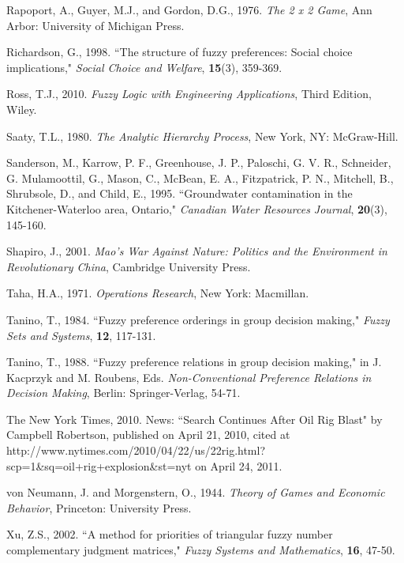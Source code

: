 \documentclass[letterpaper,12pt,titlepage,oneside,final]{book}
\begin{document}
\begin{thebibliography}{}
Rapoport, A., Guyer, M.J., and Gordon, D.G., 1976. \emph{The 2 x 2 Game}, Ann Arbor: University of Michigan Press.

Richardson, G., 1998. ``The structure of fuzzy preferences: Social choice implications," \emph{Social Choice and Welfare}, {\bf 15}(3), 359-369.

Ross, T.J., 2010. \emph{Fuzzy Logic with Engineering Applications}, Third Edition, Wiley.

Saaty, T.L., 1980. \emph{The Analytic Hierarchy Process}, New York, NY: McGraw-Hill.

Sanderson, M., Karrow, P. F., Greenhouse, J. P., Paloschi, G. V. R., Schneider, G. Mulamoottil, G., Mason, C., McBean, E. A., Fitzpatrick, P. N., Mitchell, B., Shrubsole, D., and Child, E., 1995. ``Groundwater contamination in the Kitchener-Waterloo area, Ontario," \emph{Canadian Water Resources Journal}, {\bf 20}(3), 145-160.

Shapiro, J., 2001. \emph{Mao's War Against Nature: Politics and the Environment in Revolutionary China}, Cambridge University Press.

Taha, H.A., 1971. \emph{Operations Research}, New York: Macmillan.

Tanino, T., 1984. ``Fuzzy preference orderings in group decision making," \emph{Fuzzy Sets and Systems}, {\bf 12}, 117-131.

Tanino, T., 1988. ``Fuzzy preference relations in group decision making," in J. Kacprzyk and M. Roubens, Eds. \emph{Non-Conventional Preference Relations in Decision Making}, Berlin: Springer-Verlag, 54-71.

The New York Times, 2010. News: ``Search Continues After Oil Rig Blast" by Campbell Robertson, published on April 21, 2010, cited at http://www.nytimes.com/2010/04/22/us/22rig.html?scp=1\&sq=oil+rig+explosion\&st=nyt on April 24, 2011.

von Neumann, J. and Morgenstern, O., 1944. \emph{Theory of Games and Economic Behavior}, Princeton: University Press.

Xu, Z.S., 2002. ``A method for priorities of triangular fuzzy number complementary judgment matrices," \emph{Fuzzy Systems and Mathematics}, {\bf 16}, 47-50.


\end{thebibliography}
\end{document}
